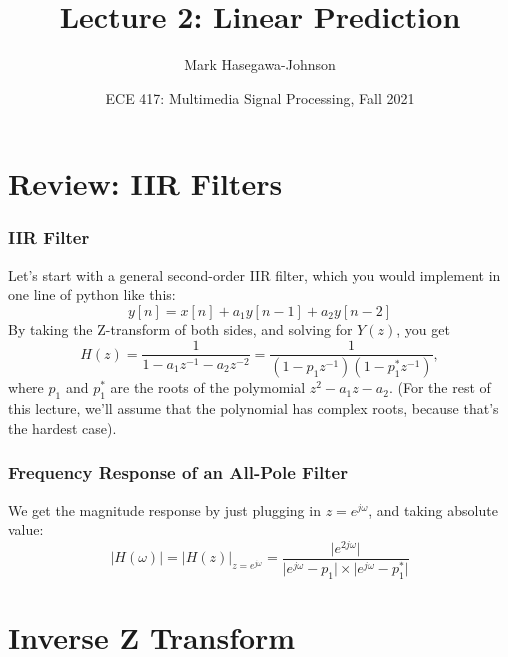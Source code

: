 \documentclass{beamer}
\title{Lecture 2: Linear Prediction}
\author{Mark Hasegawa-Johnson}
\date{ECE 417: Multimedia Signal Processing, Fall 2021}
\begin{document}
\begin{frame}
  \maketitle
\end{frame}

\begin{frame}
  \tableofcontents
\end{frame}

\section[Review]{Review: IIR Filters}
\setcounter{subsection}{1}

\begin{frame}
  \frametitle{IIR Filter}

  Let's start with a general second-order IIR filter, which you would
  implement in one line of python like this:
  \begin{displaymath}
    y[n] = x[n] + a_1y[n-1] + a_2y[n-2]
  \end{displaymath}
  By taking the Z-transform of both sides, and solving for $Y(z)$, you
  get
  \begin{displaymath}
    H(z) = \frac{1}{1-a_1z^{-1}-a_2z^{-2}}=
    \frac{1}{(1-p_1z^{-1})(1-p_1^*z^{-1})},
  \end{displaymath}
  where $p_1$ and $p_1^*$ are the roots of the polymomial
  $z^2-a_1z-a_2$.  (For the rest of this lecture, we'll assume that
  the polynomial has complex roots, because that's the hardest case).
\end{frame}

\begin{frame}
  \frametitle{Frequency Response of an All-Pole Filter}

  We get the magnitude response by just plugging in $z=e^{j\omega}$,
  and taking absolute value:
  \begin{displaymath}
    |H(\omega)| = \lvert H(z)\rvert_{z=e^{j\omega}} = \frac{\lvert e^{2j\omega}\rvert}{\lvert e^{j\omega}-p_1\rvert\times\lvert e^{j\omega}-p_1^*\rvert}
  \end{displaymath}
  \centerline{}
\end{frame}

\section[Inverse Z]{Inverse Z Transform}
\setcounter{subsection}{1}
\end{document}
